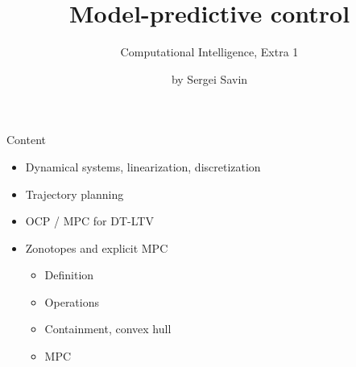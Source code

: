 \documentclass{beamer}
\title{Model-predictive control}
\subtitle{Computational Intelligence, Extra 1}
\author{by Sergei Savin}
\date{\mydate}
\begin{document}
\maketitle


\begin{frame}{Content}

\begin{itemize}
\item  Dynamical systems, linearization, discretization
\item Trajectory planning
\item OCP / MPC for DT-LTV
\item Zonotopes and explicit MPC
	\begin{itemize}
		\item  Definition
		\item  Operations
		\item Containment, convex hull
		\item MPC
	\end{itemize}
\end{itemize}

\end{frame}
\end{document}
